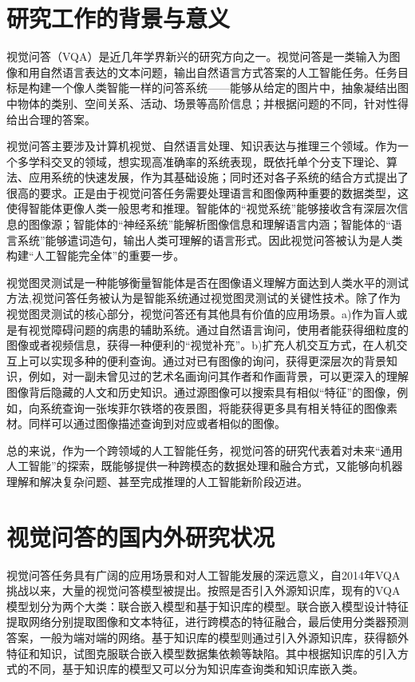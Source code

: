 \thesischapterexordium

\section{研究工作的背景与意义}

视觉问答（VQA）是近几年学界新兴的研究方向之一。视觉问答是一类输入为图像和用自然语言表达的文本问题，输出自然语言方式答案的人工智能任务。任务目标是构建一个像人类智能一样的问答系统——能够从给定的图片中，抽象凝结出图中物体的类别、空间关系、活动、场景等高阶信息；并根据问题的不同，针对性得给出合理的答案。

视觉问答主要涉及计算机视觉、自然语言处理、知识表达与推理三个领域。作为一个多学科交叉的领域，想实现高准确率的系统表现，既依托单个分支下理论、算法、应用系统的快速发展，作为其基础设施；同时还对各子系统的结合方式提出了很高的要求。正是由于视觉问答任务需要处理语言和图像两种重要的数据类型，这使得智能体更像人类一般思考和推理。智能体的“视觉系统”能够接收含有深层次信息的图像源；智能体的“神经系统”能解析图像信息和理解语言内涵；智能体的“语言系统”能够遣词造句，输出人类可理解的语言形式。因此视觉问答被认为是人类构建“人工智能完全体”的重要一步。

视觉图灵测试是一种能够衡量智能体是否在图像语义理解方面达到人类水平的测试方法,视觉问答任务被认为是智能系统通过视觉图灵测试的关键性技术。除了作为视觉图灵测试的核心部分，视觉问答还有其他具有价值的应用场景。a)作为盲人或是有视觉障碍问题的病患的辅助系统。通过自然语言询问，使用者能获得细粒度的图像或者视频信息，获得一种便利的“视觉补充”。b)扩充人机交互方式，在人机交互上可以实现多种的便利查询。通过对已有图像的询问，获得更深层次的背景知识，例如，对一副未曾见过的艺术名画询问其作者和作画背景，可以更深入的理解图像背后隐藏的人文和历史知识。通过源图像可以搜索具有相似“特征”的图像，例如，向系统查询一张埃菲尔铁塔的夜景图，将能获得更多具有相关特征的图像素材。同样可以通过图像描述查询到对应或者相似的图像。

总的来说，作为一个跨领域的人工智能任务，视觉问答的研究代表着对未来“通用人工智能”的探索，既能够提供一种跨模态的数据处理和融合方式，又能够向机器理解和解决复杂问题、甚至完成推理的人工智能新阶段迈进。

\section{视觉问答的国内外研究状况}
视觉问答任务具有广阔的应用场景和对人工智能发展的深远意义，自2014年VQA挑战以来，大量的视觉问答模型被提出。按照是否引入外源知识库，现有的VQA模型划分为两个大类：联合嵌入模型和基于知识库的模型。联合嵌入模型设计特征提取网络分别提取图像和文本特征，进行跨模态的特征融合，最后使用分类器预测答案，一般为端对端的网络。基于知识库的模型则通过引入外源知识库，获得额外特征和知识，试图克服联合嵌入模型数据集依赖等缺陷。其中根据知识库的引入方式的不同，基于知识库的模型又可以分为知识库查询类和知识库嵌入类。

